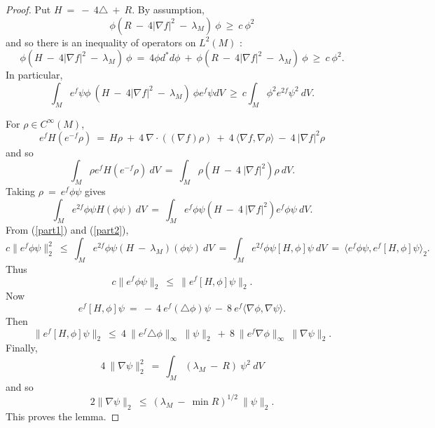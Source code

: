 \begin{proof}
Put $H \: = \: - \: 4 \triangle \: + \: R$.
By assumption,
\begin{equation}
\phi (R \: - \: 4 |\nabla f|^2 \: - \: \lambda_M) \: \phi \: \ge \: c \: \phi^2
\end{equation}
and so there is an
 inequality of operators on $L^2(M)$ :
\begin{equation}
\phi (H \: - \: 4 |\nabla f|^2 \: - \: \lambda_M) \: \phi \: = \:
4 \phi d^* d \phi \: + \:
\phi (R \: - \: 4 |\nabla f|^2 \: - \: \lambda_M) \: \phi \:
\ge \: c \: \phi^2.
\end{equation}
In particular,
\begin{equation} \label{part1}
\int_M e^f \psi\phi \: (H \: - \: 4 |\nabla f|^2 \: - \: \lambda_M) \: \phi
e^f \psi dV \: \ge \: c \int_M \phi^2 e^{2f} \psi^2 \: dV.
\end{equation}

For $\rho \in C^\infty(M)$,
\begin{equation} \label{Hf}
e^f H (e^{-f} \rho) \: = \: H \rho \: + \: 4 \: \nabla \cdot
((\nabla f) \rho) \: + \: 4 \: \langle \nabla f, \nabla \rho \rangle
\: - \: 4 \: |\nabla f|^2 \rho
\end{equation}
and so
\begin{equation}
\int_M \rho e^f H(e^{-f} \rho) \: dV \: = \:
\int_M \rho (H \: - \: 4 \: |\nabla f|^2) \rho \: dV.
\end{equation}
Taking $\rho \: = \: e^f \phi \psi$ gives
\begin{equation} \label{part2}
\int_M e^{2f} \phi \psi H(\phi \psi) \: dV \: = \:
\int_M e^f \phi \psi (H \: - \: 4 \:
|\nabla f|^2)  e^{f} \phi \psi \: dV.
\end{equation}
From (\ref{part1}) and (\ref{part2}),
\begin{equation}
c \|e^f \phi \psi \|_2^2 \: \le \:
\int_M e^{2f} \phi \psi (H \: - \: \lambda_M) (\phi \psi) \: dV \: = \:
\int_M e^{2f} \phi \psi [H, \phi] \psi \: dV \: = \:
\langle e^{f} \phi \psi, e^{f} [H, \phi] \psi \rangle_2.
\end{equation}
Thus
\begin{equation}
c \|e^f \phi \psi \|_2 \: \le \:
\|e^{f} [H, \phi] \psi\|_2.
\end{equation}
Now
\begin{equation}
e^{f} [H, \phi] \psi \: = \: - \: 4 \: e^f (\triangle \phi) \psi \: - \:
8 \: e^f \langle \nabla\phi, \nabla \psi \rangle.
\end{equation}
Then
\begin{equation}
\|e^{f} [H, \phi] \psi\|_2 \: \le \:
4 \: \|e^f \triangle \phi\|_\infty \: \|\psi\|_2 \: + \: 8 \:
\|e^f \nabla\phi\|_\infty \: \|\nabla \psi\|_2.
\end{equation}
Finally,
\begin{equation}
4 \: \|\nabla \psi\|_2^2 \: = \: \int_M (\lambda_M \: - \: R) \: \psi^2 \:
dV
\end{equation}
and so
\begin{equation}
2 \|\nabla \psi\|_2 \: \le \: (\lambda_M \: - \: \min R)^{1/2} \:
\|\psi\|_2.
\end{equation}
This proves the lemma.
\end{proof}
